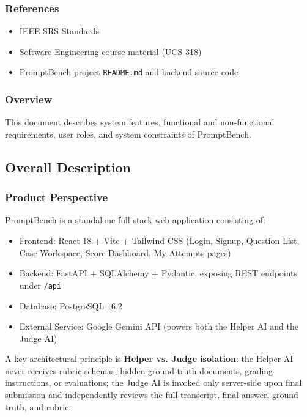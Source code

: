 \documentclass[12pt,a4paper]{report}
\begin{document}
\subsubsection{References}
\begin{itemize}[nosep]
    \item IEEE SRS Standards
    \item Software Engineering course material (UCS 318)
    \item PromptBench project \texttt{README.md} and backend source code
\end{itemize}

\subsubsection{Overview}
This document describes system features, functional and non-functional requirements, user
roles, and system constraints of PromptBench.

\subsection{Overall Description}

\subsubsection{Product Perspective}
PromptBench is a standalone full-stack web application consisting of:
\begin{itemize}[nosep]
    \item Frontend: React 18 + Vite + Tailwind CSS (Login, Signup, Question List, Case Workspace,
    Score Dashboard, My Attempts pages)
    \item Backend: FastAPI + SQLAlchemy + Pydantic, exposing REST endpoints under \texttt{/api}
    \item Database: PostgreSQL 16.2
    \item External Service: Google Gemini API (powers both the Helper AI and the Judge AI)
\end{itemize}
A key architectural principle is \textbf{Helper vs. Judge isolation}: the Helper AI never
receives rubric schemas, hidden ground-truth documents, grading instructions, or evaluations; the
Judge AI is invoked only server-side upon final submission and independently reviews the full
transcript, final answer, ground truth, and rubric.
\end{document}
